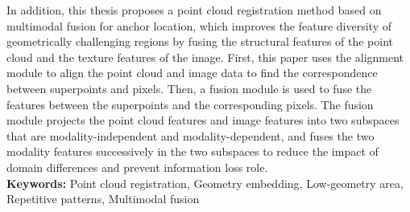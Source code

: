 In addition, this thesis proposes a point cloud registration method based on multimodal fusion for anchor location, which improves the feature diversity of geometrically challenging regions by fusing the structural features of the point cloud and the texture features of the image. First, this paper uses the alignment module to align the point cloud and image data to find the correspondence between superpoints and pixels. Then, a fusion module is used to fuse the features between the superpoints and the corresponding pixels. The fusion module projects the point cloud features and image features into two subspaces that are modality-independent and modality-dependent, and fuses the two modality features successively in the two subspaces to reduce the impact of domain differences and prevent information loss role.\\

\noindent\textbf{Keywords:} Point cloud registration, Geometry embedding, Low-geometry area, Repetitive patterns, Multimodal fusion

\clearpage